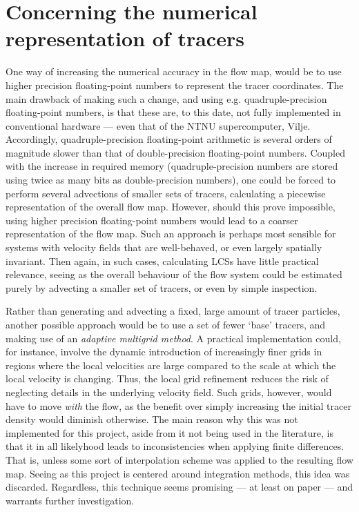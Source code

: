 \section{Concerning the numerical representation of tracers}
\label{sec:concerning_the_numerical_representation_of_tracers}

One way of increasing the numerical accuracy in the flow map, would be
to use higher precision floating-point numbers to represent the tracer
coordinates. The main drawback of making such a change, and using e.g.
quadruple-precision floating-point numbers, is that these are, to this date,
not fully implemented in conventional hardware --- even that of the NTNU
supercomputer, Vilje. Accordingly, quadruple-precision floating-point
arithmetic is several orders of magnitude slower than that of double-precision
floating-point numbers. Coupled with the increase in required memory
(quadruple-precision numbers are stored using twice as many bits as
double-precision numbers), one could be forced to perform several
advections of smaller sets of tracers, calculating a piecewise representation
of the overall flow map. However, should this prove impossible, using higher
precision floating-point numbers would lead to a coarser representation
of the flow map. Such an approach is perhaps most sensible for systems with
velocity fields that are well-behaved, or even largely spatially invariant.
Then again, in such cases, calculating LCSs have little practical relevance,
seeing as the overall behaviour of the flow system could be estimated purely by
advecting a smaller set of tracers, or even by simple inspection.

Rather than generating and advecting a fixed, large amount of tracer particles,
another possible approach would be to use a set of fewer `base' tracers, and
making use of an \emph{adaptive multigrid method}. A practical implementation
could, for instance, involve the dynamic introduction of increasingly finer
grids in regions where the local velocities are large compared to the scale at
which the local velocity is changing. Thus, the local grid refinement reduces
the risk of neglecting details in the underlying velocity field. Such grids,
however, would have to move \emph{with} the flow, as the benefit over simply
increasing the initial tracer density would diminish otherwise. The main reason
why this was not implemented for this project, aside from it not being used in
the literature, is that it in all likelyhood leads to inconsistencies when
applying finite differences. That is, unless some sort of interpolation scheme
was applied to the resulting flow map. Seeing as this project is centered around
integration methods, this idea was discarded. Regardless, this technique seems
promising --- at least on paper --- and warrants further investigation.
\clearpage
